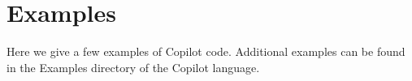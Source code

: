 \section{Examples} \label{sec:examples}

Here we give a few examples of Copilot code. Additional examples can be found in the Examples directory of the Copilot language. 




